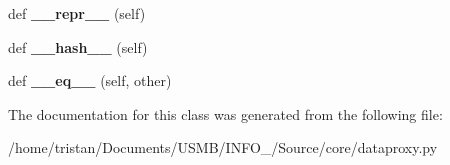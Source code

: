 \begin{DoxyCompactItemize}
\mbox{\label{classSource_1_1core_1_1dataproxy_1_1DataProxy_a82612aa284510b0b836727802cf86f52}} 
def {\bfseries \+\_\+\+\_\+repr\+\_\+\+\_\+} (self)
\item 
\mbox{\label{classSource_1_1core_1_1dataproxy_1_1DataProxy_abfdb23d5f9fe6607f94c27882cd663bc}} 
def {\bfseries \+\_\+\+\_\+hash\+\_\+\+\_\+} (self)
\item 
\mbox{\label{classSource_1_1core_1_1dataproxy_1_1DataProxy_ab50bec189ad0e5551b1d2b95c1c1f55e}} 
def {\bfseries \+\_\+\+\_\+eq\+\_\+\+\_\+} (self, other)
\end{DoxyCompactItemize}


The documentation for this class was generated from the following file\+:\begin{DoxyCompactItemize}
\item 
/home/tristan/\+Documents/\+U\+S\+M\+B/\+I\+N\+F\+O\+\_/\+Source/core/dataproxy.\+py\end{DoxyCompactItemize}
